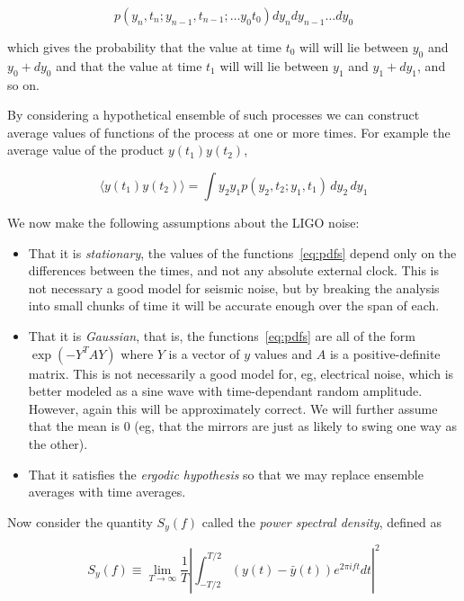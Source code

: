\begin{equation*}
\label{eq:pdfs}
p(y_n, t_n; y_{n-1}, t_{n-1}; \ldots y_0 t_0) dy_n dy_{n-1} \ldots
dy_0
\end{equation*}

which gives the probability that the value at time $t_0$ will will
lie between $y_0$ and $y_0 + dy_0$ and that the value at time $t_1$
will will lie between $y_1$ and $y_1 + dy_1$, and so on.

By considering a hypothetical ensemble of such processes we can 
construct average values of functions of the process at one or more
times.  For example the average value of the product $y(t_1)y(t_2)$,

\begin{equation*}
\langle y(t_1) y(t_2) \rangle = \int y_2 y_1
p(y_2, t_2; y_1, t_1)\, dy_2\, dy_1
\end{equation*}

We now make the following assumptions about the LIGO noise:

\begin{itemize}
\item That it is \emph{stationary}, the values of the
functions~\ref{eq:pdfs} depend only on the differences between the
times, and not any absolute external clock.  This is not necessary a
good model for seismic noise, but by breaking the analysis into small
chunks of time it will be accurate enough over the span of each.

\item That it is \emph{Gaussian}, that is, the functions~\ref{eq:pdfs}
are all of the form $\exp(-Y^T A Y)$ where $Y$ is a vector of $y$
values and  $A$ is a positive-definite matrix.  This is not
necessarily a good model for, eg, electrical noise, which is better
modeled as a sine wave with time-dependant random amplitude.  However,
again this will be approximately correct.  We will further assume that
the mean is 0 (eg, that the mirrors are just as likely to swing one
way as the other).

\item That it satisfies the \emph{ergodic hypothesis} so that we may
replace ensemble averages with time averages.

\end{itemize}

Now consider the quantity $S_y(f)$ called the \emph{power spectral
density}, defined as

\begin{equation}
\label{eq:psd1}
S_y(f) \equiv \lim_{T \to \infty} 
\frac{1}{T} \left| \int_{-T/2}^{T/2} (y(t) - \bar{y}(t))
e^{2 \pi i f t} dt \right|^2
\end{equation}

